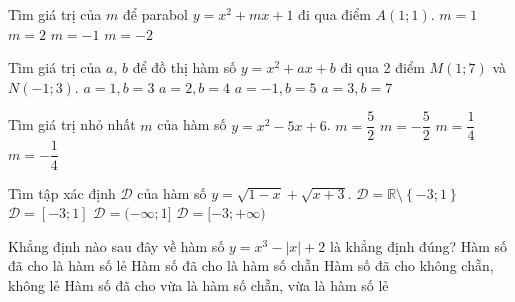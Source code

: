 \begin{ex}%
	Tìm giá trị của $m$ để parabol $y=x^2+mx+1$ đi qua điểm $A(1;1)$.
	\choice
	{$m=1$}
	{$m=2$}
	{\True $m=-1$}
	{$m=-2$}
\end{ex}

\begin{ex}%
	Tìm giá trị của $a$, $b$ để đồ thị hàm số $y=x^2+ax+b$ đi qua 2 điểm $M(1;7)$ và $N(-1;3)$.
	\choice
	{$a=1,b=3$}
	{\True $a=2,b=4$}
	{$a=-1,b=5$}
	{$a=3,b=7$}
\end{ex}

\begin{ex}%
	Tìm giá trị nhỏ nhất $m$ của hàm số $y=x^2-5x+6$.
	\choice
	{$m=\dfrac{5}{2}$}
	{$m=-\dfrac{5}{2}$}
	{$m=\dfrac{1}{4}$}
	{\True $m=-\dfrac{1}{4}$}
\end{ex}

\begin{ex}%
	Tìm tập xác định $\mathscr{D}$ của hàm số $y=\sqrt{1-x}+\sqrt{x+3}$.
	\choice
	{$\mathscr{D}=\mathbb{R}\setminus\left\{-3;1\right\}$}
	{\True $\mathscr{D}=[-3;1]$}
	{$\mathscr{D}=(-\infty;1]$}
	{$\mathscr{D}=[-3;+\infty)$}
\end{ex}

\begin{ex}%
	Khẳng định nào sau đây về hàm số $y=x^3-\lvert{x}\rvert+2$ là khẳng định đúng?
	\choice
	{Hàm số đã cho là hàm số lẻ}
	{Hàm số đã cho là hàm số chẵn}
	{\True Hàm số đã cho không chẵn, không lẻ}
	{Hàm số đã cho vừa là hàm số chẵn, vừa là hàm số lẻ}
\end{ex}

